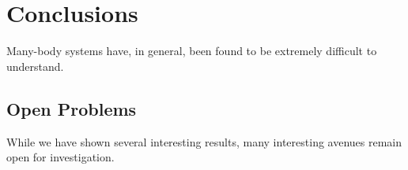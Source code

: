 \documentclass[../thesis-main/thesis-main]{subfiles}
\begin{document}
 
\chapter{Conclusions}

Many-body systems have, in general, been found to be extremely difficult to understand.  

\section{Open Problems}

While we have shown several interesting results, many interesting avenues remain open for investigation.  
\end{document}
